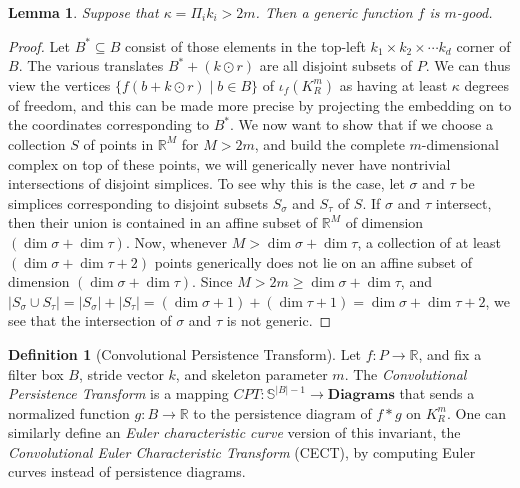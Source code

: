 \documentclass[conference]{IEEEtran}
\newtheorem{lemma}[theorem]{Lemma}
\theoremstyle{definition}
\newtheorem{definition}[theorem]{Definition}
\numberwithin{figure}{section}
\begin{document}
\begin{lemma}
Suppose that $\kappa = \Pi_{i}k_i > 2m$. Then a generic function $f$ is $m$-good.
\end{lemma}
\begin{proof}
	Let $B^{*} \subseteq B$ consist of those elements in the top-left $k_1 \times k_2 \times \cdots k_d$ corner of $B$. The various translates $B^{*} + (k \odot r)$ are all disjoint subsets of $P$. We can thus view the vertices $\{f(b + k \odot r) \mid b \in B\}$ of $\iota_{f}(K_{R}^m)$ as having at least $\kappa$ degrees of freedom, and this can be made more precise by projecting the embedding on to the coordinates corresponding to $B^*$. We now want to show that if we choose a collection $S$ of points in $\mathbb{R}^{M}$ for $M > 2m$, and build the complete $m$-dimensional complex on top of these points, we will generically never have nontrivial intersections of disjoint simplices. To see why this is the case, let $\sigma$ and $\tau$ be simplices corresponding to disjoint subsets $S_{\sigma}$ and $S_{\tau}$ of $S$. If $\sigma$ and $\tau$ intersect, then their union is contained in an affine subset of $\mathbb{R}^M$ of dimension $(\dim \sigma + \dim \tau)$. Now, whenever $M > \dim \sigma + \dim \tau$, a collection of at least $(\dim \sigma + \dim \tau + 2)$ points generically does not lie on an affine subset of dimension $(\dim \sigma + \dim \tau)$. Since $M > 2m \geq \dim \sigma + \dim \tau$, and $|S_{\sigma} \cup S_{\tau}| = |S_{\sigma}| + |S_{\tau}| = (\dim \sigma + 1) + (\dim \tau + 1) = \dim \sigma + \dim \tau + 2$, we see that the intersection of $\sigma$ and $\tau$ is not generic.
\end{proof}

\begin{definition}[Convolutional Persistence Transform]
Let $f: P \to \mathbb{R}$, and fix a filter box $B$, stride vector $k$, and skeleton parameter $m$. The \emph{Convolutional Persistence Transform}  is a mapping $CPT: \mathbb{S}^{|B|-1} \to \mathbf{Diagrams}$ that sends a normalized function $g: B \to \mathbb{R}$ to the persistence diagram of $f \ast g$ on $K_{R}^{m}$. One can similarly define an \emph{Euler characteristic curve} version of this invariant, the \emph{Convolutional Euler Characteristic Transform} (CECT), by computing Euler curves instead of persistence diagrams. 
\end{definition}
\end{document}
